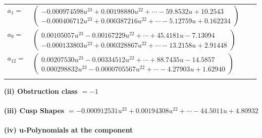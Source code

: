 \documentclass[1p]{elsarticle_modified}
\theoremstyle{definition}
\begin{document}
\begin{tabular}{m{7pt} m{180pt} m{7pt} m{180pt} }
\flushright $a_{1}=$&$\begin{pmatrix}-0.000974598 u^{23}+0.00198880 u^{22}+\cdots-59.8532 u+10.2543\\-0.000406712 u^{23}+0.000387216 u^{22}+\cdots-5.12759 u+0.162234\end{pmatrix}$ \\
\flushright $a_{9}=$&$\begin{pmatrix}0.00105057 u^{23}-0.00167229 u^{22}+\cdots+45.4181 u-7.13094\\-0.000133803 u^{23}+0.000328867 u^{22}+\cdots-13.2158 u+2.91448\end{pmatrix}$ \\
\flushright $a_{12}=$&$\begin{pmatrix}0.00207530 u^{23}-0.00334512 u^{22}+\cdots+88.7435 u-14.5857\\0.000298832 u^{23}-0.0000705567 u^{22}+\cdots-4.27903 u+1.62940\end{pmatrix}$\\&\end{tabular}
\flushleft \textbf{(ii) Obstruction class $= -1$}\\~\\
\flushleft \textbf{(iii) Cusp Shapes $= -0.000912531 u^{23}+0.00194308 u^{22}+\cdots-44.5011 u+4.80932$}\\~\\
\newpage\renewcommand{\arraystretch}{1}
\flushleft \textbf{(iv) u-Polynomials at the component}\newline \\
\end{document}
